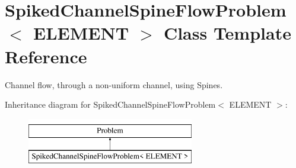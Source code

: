 \hypertarget{classSpikedChannelSpineFlowProblem}{}\section{Spiked\+Channel\+Spine\+Flow\+Problem$<$ E\+L\+E\+M\+E\+NT $>$ Class Template Reference}
\label{classSpikedChannelSpineFlowProblem}


Channel flow, through a non-\/uniform channel, using Spines.  


Inheritance diagram for Spiked\+Channel\+Spine\+Flow\+Problem$<$ E\+L\+E\+M\+E\+NT $>$\+:\begin{figure}[H]
\begin{center}
\leavevmode
\includegraphics[height=2.000000cm]{classSpikedChannelSpineFlowProblem}
\end{center}
\end{figure}
